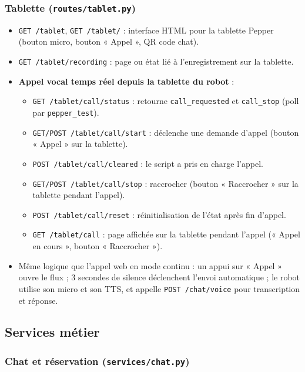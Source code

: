 \documentclass[12pt,a4paper]{article}
\begin{document}
\subsubsection{Tablette (\texttt{routes/tablet.py})}

\begin{itemize}[noitemsep]
  \item \texttt{GET /tablet}, \texttt{GET /tablet/} : interface HTML pour la tablette Pepper (bouton micro, bouton « Appel », QR code chat).
  \item \texttt{GET /tablet/recording} : page ou état lié à l'enregistrement sur la tablette.
  \item \textbf{Appel vocal temps réel depuis la tablette du robot} :
  \begin{itemize}[noitemsep]
    \item \texttt{GET /tablet/call/status} : retourne \texttt{call\_requested} et \texttt{call\_stop} (poll par \texttt{pepper\_test}).
    \item \texttt{GET/POST /tablet/call/start} : déclenche une demande d'appel (bouton « Appel » sur la tablette).
    \item \texttt{POST /tablet/call/cleared} : le script a pris en charge l'appel.
    \item \texttt{GET/POST /tablet/call/stop} : raccrocher (bouton « Raccrocher » sur la tablette pendant l'appel).
    \item \texttt{POST /tablet/call/reset} : réinitialisation de l'état après fin d'appel.
    \item \texttt{GET /tablet/call} : page affichée sur la tablette pendant l'appel (« Appel en cours », bouton « Raccrocher »).
  \end{itemize}
  \item Même logique que l'appel web en mode continu : un appui sur « Appel » ouvre le flux ; 3 secondes de silence déclenchent l'envoi automatique ; le robot utilise son micro et son TTS, et appelle \texttt{POST /chat/voice} pour transcription et réponse.
\end{itemize}

\subsection{Services métier}

\subsubsection{Chat et réservation (\texttt{services/chat.py})}
\end{document}

